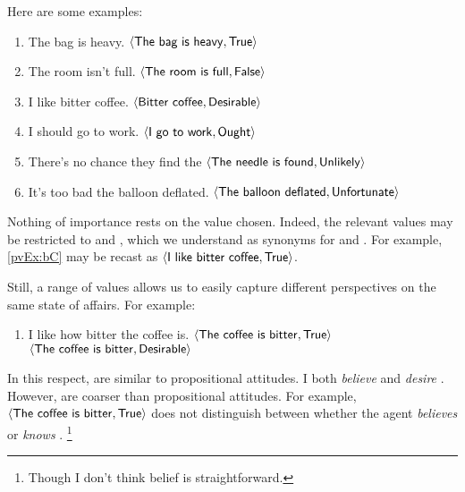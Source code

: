 \begin{note}
  Here are some examples:

  \begin{enumerate}[label=\arabic*., ref=(\arabic*),noitemsep, series=propValExC]
  \item
    The bag is heavy.%
    \hfill%
    \(\pv{\prop{The bag is heavy}}{\val{True}}\)
  \item
    The room isn't full.%
    \hfill%
    \(\pv{\prop{The room is full}}{\val{False}}\)
  \item
    \label{pvEx:bC}
    I like bitter coffee.%
    \hfill%
    \(\pv{\prop{Bitter coffee}}{\val{Desirable}}\)
  \item
    I should go to work.%
    \hfill%
    \(\pv{\prop{I go to work}}{\val{Ought}}\)
  \item
    There's no chance they find the%
    \hfill%
    \(\pv{\prop{The needle is found}}{\val{Unlikely}}\)
  \item
    It's too bad the balloon deflated.%
    \hfill%
    \(\pv{\prop{The balloon deflated}}{\val{Unfortunate}}\)
  \end{enumerate}

  Nothing of importance rests on the value chosen.
  Indeed, the relevant values may be restricted to  and , which we understand as synonyms for  and .
  For example, \ref{pvEx:bC} may be recast as \(\pv{\prop{I like bitter coffee}}{\val{True}}\).

  Still, a range of values allows us to easily capture different perspectives on the same state of affairs.
  For example:
  \begin{enumerate}[label=\arabic*., ref=(\arabic*),noitemsep, resume*=propValExC]
  \item I like how bitter the coffee is.%
    \hfill%
    \(\pv{\prop{The coffee is bitter}}{\val{True}}\)\newline
    \hfill%
    \(\pv{\prop{The coffee is bitter}}{\val{Desirable}}\)
  \end{enumerate}

  In this respect, \evalN{} are similar to propositional attitudes.
  I both \emph{believe}  and \emph{desire} .
  However,  are coarser than propositional attitudes.
  For example, \(\pv{\prop{The coffee is bitter}}{\val{True}}\) does not distinguish between whether the agent \emph{believes} or \emph{knows} .%
  \footnote{
    \label{fn:belief-is-difficult}
    Though I don't think belief is straightforward.

}
\end{note}
